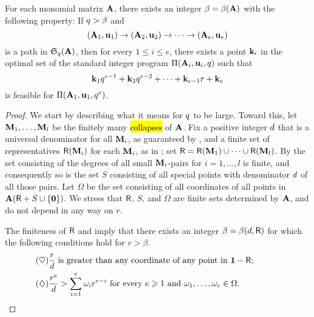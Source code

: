 \documentclass{article}
\begin{document}

\begin{theorem}
\label{ILL: T}
   For each monomial matrix $\mathbf{A}$, there exists an integer $\beta = \beta(\mathbf{A})$ with the following property\textup:
   If $q>\beta$ and \[ (\mathbf{A}_1, \mathbf{u}_1) \to (\mathbf{A}_2, \mathbf{u}_2) \to \cdots \to (\mathbf{A}_e, \mathbf{u}_e)\] is a path in $\mathfrak{S}_{q}(\mathbf{A})$, then for every $1 \leq i \leq e$, there exists a point $\mathbf{k}_i$ in the optimal set of the standard integer program $\Pi(\mathbf{A}_i, \mathbf{u}_i, q)$  such that
   \[
      \mathbf{k}_1 q^{e-1} + \mathbf{k}_2 q^{e-2} + \cdots + \mathbf{k}_{e-1} r + \mathbf{k}_e
   \]
   is feasible for $\Pi(\mathbf{A}_1, \mathbf{u}_1, q^e)$.
 \end{theorem}

\begin{proof}
   We start by describing what it means for $q$ to be large.
   Toward this, let $\mathbf{M}_1, \ldots, \mathbf{M}_l$ be the finitely many \hl{collapses} of  $\mathbf{A}$.
   Fix a positive integer $d$ that is a universal denominator for all $\mathbf{M}_i$, as guaranteed by , and a finite set of representatives $\mathsf{R}(\mathbf{M}_i)$ for each $\mathbf{M}_i$, as in ; set $\mathsf{R} = \mathsf{R}(\mathbf{M}_1) \cup \cdots \cup \mathsf{R}(\mathbf{M}_l)$.
   By  the set consisting of the degrees of all small $\mathbf{M}_i$-pairs for $i=1,\ldots,l$ is finite, and consequently so is the set $S$ consisting of all special points with denominator $d$ of all those pairs.
   Let $\Omega$ be the set consisting of all coordinates of all points in $\mathbf{A}(\mathsf{R}+S\cup\{\mathbf{0}\})$.
   We stress that $\mathsf{R}$, $S$, and $\Omega$ are finite sets determined by $\mathbf{A}$, and do not depend in any way on $r$.

   The finiteness of $\mathsf{R}$  and 
   imply that there exists an integer $\beta = \beta(d, \mathsf{R})$ for which the following conditions hold for $r > \beta$.
    \begin{align}
      \tag{$\heartsuit$} \label{r-big-1}
      &\text{$\frac{r}{d}$ is greater than any coordinate of any point in $\mathbf{1} - \mathsf{R}$;}\qquad\qquad\quad \\
      \tag{$\diamondsuit$} \label{r-big-2}
      &\text{$\frac{r^e}{d} > \sum_{i=1}^e \omega_i r^{e-i}$ for every $e \geqslant 1$ and $\omega_1, \ldots, \omega_e \in \Omega$.}
    \end{align}


\end{proof}
\end{document}
